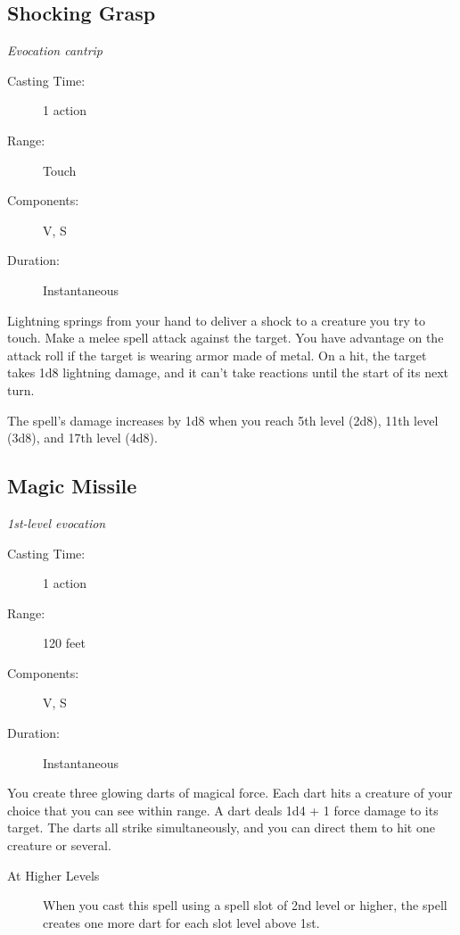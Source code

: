 \documentclass[letterpaper,10pt,twoside,twocolumn,openany]{book}
\begin{document}
\subsection{Shocking Grasp} \hypertarget{Shocking Grasp}{}
\begin{hangingpar}
	\textit{Evocation cantrip}
\end{hangingpar}

\begin{description}
	\item[Casting Time:] 1 action 
	\item[Range:] Touch 
	\item[Components:] V, S
	\item[Duration:] Instantaneous
\end{description}

Lightning springs from your hand to deliver a shock to a creature you try to touch. Make a melee spell attack against the target. You have advantage on the attack roll if the target is wearing armor made of metal. On a hit, the target takes 1d8 lightning damage, and it can't take reactions until the start of its next turn.

The spell's damage increases by 1d8 when you reach 5th level (2d8), 11th level (3d8), and 17th level (4d8). 

\subsection{Magic Missile} \hypertarget{Magic Missile}{}
\begin{hangingpar}
	\textit{1st-level evocation}
\end{hangingpar}

\begin{description}
	\item[Casting Time:] 1 action 
	\item[Range:] 120 feet
	\item[Components:] V, S 
	\item[Duration:] Instantaneous 
\end{description}

You create three glowing darts of magical force. Each dart hits a creature of your choice that you can see within range. A dart deals 1d4 + 1 force damage to its target. The darts all strike simultaneously, and you can direct them to hit one creature or several. 

\begin{description}
	\item[At Higher Levels] When you cast this spell using a spell slot of 2nd level or higher, the spell creates one more dart for each slot level above 1st.
\end{description}
\end{document}
